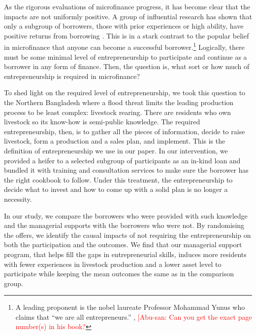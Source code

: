 	As the rigorous evaluations of microfinance progress, it has become clear that the impacts are not uniformly positive. A group of influential research has shown that only a subgroup of borrowers, those with prior experiences or high ability, have positive returns from borrowing \citep{Banerjee2015Miracle, Mckenzie2017Spurring, Buera2017, Banerjee2019MFPovertyTrap}. This is in a stark contrast to the popular belief in microfinance that anyone can become a successful borrower.\footnote{A leading proponent is the nobel laureate Professor Mohammad Yunus who claims that ``we are all entrepreneurs.'' \citep{Yunus2003}, \citep{Cosic2017} \textcolor{red}{[Abu-san: Can you get the exact page number(s) in his book?} } Logically, there must be some minimal level of entrepreneurship to participate and continue as a borrower in any form of finance. Then, the question is, what sort or how much of entrepreneurship is required in microfinance? 
	
	To shed light on the required level of entrepreneurship, we took this question to the Northern Bangladesh where a flood threat limits the leading production process to be least complex: livestock rearing. There are residents who own livestock so its know-how is semi-public knowledge. The required entrepreneurship, then, is to gather all the pieces of information, decide to raise livestock, form a production and a sales plan, and implement. This is the definition of entrepreneurship we use in our paper. In our intervention, we provided a heifer to a selected subgroup of participants as an in-kind loan and bundled it with training and consultation services to make sure the borrower has the right cookbook to follow. Under this treatment, the entrepreneurship to decide what to invest and how to come up with a solid plan is no longer a necessity.

	In our study, we compare the borrowers who were provided with such knowledge and the managerial supports with the borrowers who were not. By randomising the offers, we identify the causal impacts of not requiring the entrepreneurship on both the participation and the outcomes. We find that our managerial support program, that helps fill the gaps in entrepreneurial skills, induces more residents with fewer experiences in livestock production and a lower asset level to participate while keeping the mean outcomes the same as in the comparison group.%

